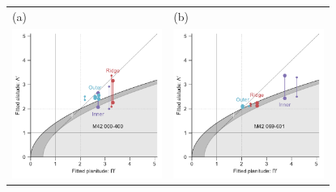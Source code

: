 \begin{figure}
  \begin{tabular}{p{0.47\linewidth} p{0.47\linewidth}}
    (a) & (b) \\
    \includegraphics[width=\linewidth]{figs/000-400-planitude-alatude}
    & \includegraphics[width=\linewidth]{figs/069-601-planitude-alatude}

\end{tabular}
\end{figure}
